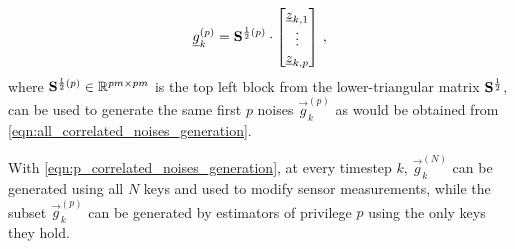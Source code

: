 \documentclass[conference]{IEEEtran}
\begin{document}
\begin{equation}\label{eqn:p_correlated_noises_generation}
  \vec{g}_k^{(p)}=
  \mat{S}^{\frac{1}{2}(p)}\cdot
  \begin{bmatrix}
    \vec{z}_{k,1}\\
    \vdots\\
    \vec{z}_{k,p}
  \end{bmatrix}\,,
\end{equation}
where ${{\mathbf{S}}}^{\frac{1}{2}(p)}\in\mathbb{R}^{pm\times pm}$ is the top left block from the lower-triangular matrix ${{\mathbf{S}}}^\frac{1}{2}$, can be used to generate the same first $p$ noises $\vec{g}_k^{(p)}$ as would be obtained from \eqref{eqn:all_correlated_noises_generation}.

With \eqref{eqn:p_correlated_noises_generation}, at every timestep $k$, $\vec{g}_k^{(N)}$ can be generated using all $N$ keys and used to modify sensor measurements, while the subset $\vec{g}_k^{(p)}$ can be generated by estimators of privilege $p$ using the only keys they hold.

% 
% 
\end{document}
